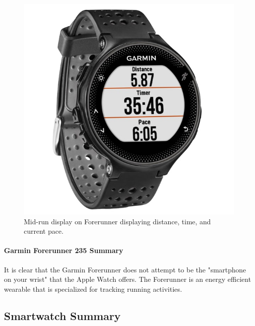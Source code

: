 \begin{figure}[h!]
    \centering
    \includegraphics[scale=0.25]{media/garmin_running.jpg}
    \caption{Mid-run display on Forerunner displaying distance, time, and current pace.}
    \label{fig:garm_disp}
\end{figure}

\paragraph{Garmin Forerunner 235 Summary}
It is clear that the Garmin Forerunner does not attempt to be the "smartphone on your wrist" that the Apple
Watch offers. The Forerunner is an energy efficient wearable that is specialized for tracking running
activities.





\subsection{Smartwatch Summary}
